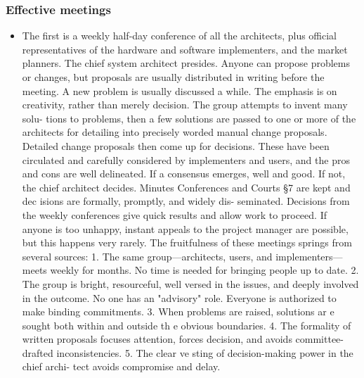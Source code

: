 \documentclass[letterpaper,12pt]{article}
\begin{document}
\subsubsection{Effective meetings}
\begin{itemize}
 \item The  first is  a  weekly  half-day conference  of  all  the  architects,
       plus official representatives  of the  hardware  and  software implementers,
       and the  market planners. The chief  system architect presides. Anyone  can
       propose  problems  or  changes,  but  proposals  are usually distributed in
       writing before the  meeting. A new problem is  usually discussed  a while. The
       emphasis  is  on creativity, rather than merely decision. The group attempts
       to  invent many solu- tions  to problems, then a few solutions  are  passed  to
       one  or  more of the architects for detailing into precisely worded manual
       change proposals. Detailed change proposals then come up for decisions. These
       have  been circulated  and carefully considered  by implementers and users, and
       the pros and cons are well delineated. If a consensus emerges, well and good.
       If not, the chief architect decides. Minutes Conferences and  Courts §7 are
       kept  and  dec isions  are formally, promptly,  and  widely  dis- seminated.
       Decisions from the weekly conferences give quick results and allow work to
       proceed. If anyone is too unhappy, instant appeals to the project manager are
       possible, but this happens very rarely. The  fruitfulness  of these  meetings
       springs from several sources: 1. The same group—architects, users, and
       implementers—meets weekly for months. No time is needed for bringing people up
       to  date. 2. The group is bright, resourceful, well versed in the issues, and
       deeply  involved  in  the  outcome. No  one  has  an "advisory" role. Everyone
       is authorized to make binding commitments. 3. When  problems  are raised,
       solutions ar e sought both within and  outside  th e obvious boundaries. 4. The
       formality  of written proposals  focuses attention, forces decision, and avoids
       committee-drafted inconsistencies. 5. The  clear  ve sting of decision-making
       power in the chief archi- tect  avoids compromise and delay.


\end{itemize}
\end{document}
